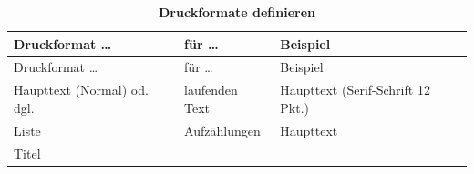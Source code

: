 \documentclass[]{book}
\theoremstyle{definition}
\theoremstyle{definition}
\theoremstyle{definition}
\theoremstyle{remark}
\begin{document}
\begin{longtable}[]{@{}lll@{}}
\caption{\textbf{\label{tab:druckformate} Druckformate
definieren}}\tabularnewline
\toprule
\begin{minipage}[b]{0.11\columnwidth}\raggedright\strut
Druckformat \ldots{}\strut
\end{minipage} & \begin{minipage}[b]{0.41\columnwidth}\raggedright\strut
für \ldots{}\strut
\end{minipage} & \begin{minipage}[b]{0.38\columnwidth}\raggedright\strut
Beispiel\strut
\end{minipage}\tabularnewline
\midrule
\endfirsthead
\toprule
\begin{minipage}[b]{0.11\columnwidth}\raggedright\strut
Druckformat \ldots{}\strut
\end{minipage} & \begin{minipage}[b]{0.41\columnwidth}\raggedright\strut
für \ldots{}\strut
\end{minipage} & \begin{minipage}[b]{0.38\columnwidth}\raggedright\strut
Beispiel\strut
\end{minipage}\tabularnewline
\midrule
\endhead
\begin{minipage}[t]{0.11\columnwidth}\raggedright\strut
Haupttext (Normal) od. dgl.\strut
\end{minipage} & \begin{minipage}[t]{0.41\columnwidth}\raggedright\strut
laufenden Text\strut
\end{minipage} & \begin{minipage}[t]{0.38\columnwidth}\raggedright\strut
Haupttext (Serif-Schrift 12 Pkt.) \vspace{-6mm}\strut
\end{minipage}\tabularnewline
\begin{minipage}[t]{0.11\columnwidth}\raggedright\strut
Liste\strut
\end{minipage} & \begin{minipage}[t]{0.41\columnwidth}\raggedright\strut
Aufzählungen\strut
\end{minipage} & \begin{minipage}[t]{0.38\columnwidth}\raggedright\strut
Haupttext\strut
\end{minipage}\tabularnewline
\begin{minipage}[t]{0.11\columnwidth}\raggedright\strut
Titel\strut
\end{minipage} & \begin{minipage}[t]{0.41\columnwidth}\raggedright\strut

\end{minipage}
\end{longtable}
\end{document}
